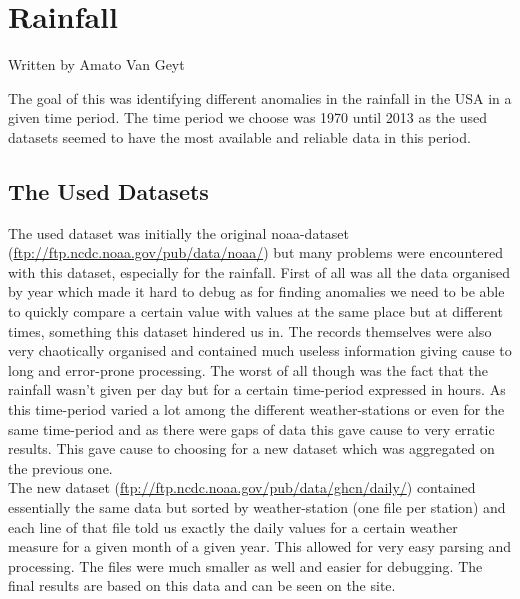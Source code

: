 \section{Rainfall}
Written by Amato Van Geyt

The goal of this was identifying different anomalies in the rainfall in the USA in a given time period. The time period we choose was 1970 until 2013 as the used datasets seemed to have the most available and reliable data in this period. \\ 

\subsection{The Used Datasets}
The used dataset was initially the original noaa-dataset (\url{ftp://ftp.ncdc.noaa.gov/pub/data/noaa/}) but many problems were encountered with this dataset, especially for the rainfall. First of all was all the data organised by year which made it hard to debug as for finding anomalies we need to be able to quickly compare a certain value with values at the same place but at different times, something this dataset hindered us in. The records themselves were also very chaotically organised and contained much useless information giving cause to long and error-prone processing. The worst of all though was the fact that the rainfall wasn't given per day but for a certain time-period expressed in hours. As this time-period varied a lot among the different weather-stations or even for the same time-period and as there were gaps of data this gave cause to very erratic results. This gave cause to choosing for a new dataset which was aggregated on the previous one. \\ 
The new dataset (\url{ftp://ftp.ncdc.noaa.gov/pub/data/ghcn/daily/}) contained essentially the same data but sorted by weather-station (one file per station) and each line of that file told us exactly the daily values for a certain weather measure for a given month of a given year. This allowed for very easy parsing and processing. The files were much smaller as well and easier for debugging. The final results are based on this data and can be seen on the site.\\ 

